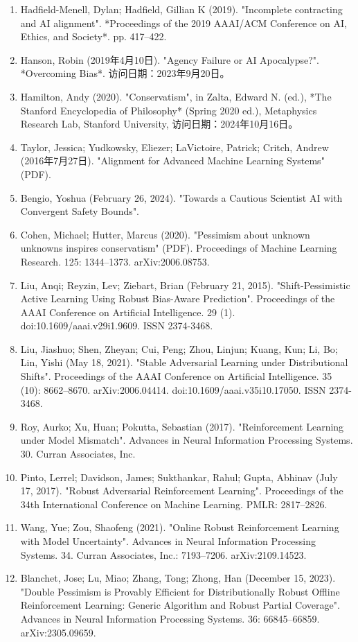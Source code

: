 \begin{enumerate}
\item Hadfield-Menell, Dylan; Hadfield, Gillian K (2019). "Incomplete contracting and AI alignment". *Proceedings of the 2019 AAAI/ACM Conference on AI, Ethics, and Society*. pp. 417–422.
\item Hanson, Robin (2019年4月10日). "Agency Failure or AI Apocalypse?". *Overcoming Bias*. 访问日期：2023年9月20日。
\item Hamilton, Andy (2020). "Conservatism", in Zalta, Edward N. (ed.), *The Stanford Encyclopedia of Philosophy* (Spring 2020 ed.), Metaphysics Research Lab, Stanford University, 访问日期：2024年10月16日。
\item Taylor, Jessica; Yudkowsky, Eliezer; LaVictoire, Patrick; Critch, Andrew (2016年7月27日). "Alignment for Advanced Machine Learning Systems" (PDF).
\item Bengio, Yoshua (February 26, 2024). "Towards a Cautious Scientist AI with Convergent Safety Bounds".
\item Cohen, Michael; Hutter, Marcus (2020). "Pessimism about unknown unknowns inspires conservatism" (PDF). Proceedings of Machine Learning Research. 125: 1344–1373. arXiv:2006.08753.
\item Liu, Anqi; Reyzin, Lev; Ziebart, Brian (February 21, 2015). "Shift-Pessimistic Active Learning Using Robust Bias-Aware Prediction". Proceedings of the AAAI Conference on Artificial Intelligence. 29 (1). doi:10.1609/aaai.v29i1.9609. ISSN 2374-3468.
\item Liu, Jiashuo; Shen, Zheyan; Cui, Peng; Zhou, Linjun; Kuang, Kun; Li, Bo; Lin, Yishi (May 18, 2021). "Stable Adversarial Learning under Distributional Shifts". Proceedings of the AAAI Conference on Artificial Intelligence. 35 (10): 8662–8670. arXiv:2006.04414. doi:10.1609/aaai.v35i10.17050. ISSN 2374-3468.
\item Roy, Aurko; Xu, Huan; Pokutta, Sebastian (2017). "Reinforcement Learning under Model Mismatch". Advances in Neural Information Processing Systems. 30. Curran Associates, Inc.
\item Pinto, Lerrel; Davidson, James; Sukthankar, Rahul; Gupta, Abhinav (July 17, 2017). "Robust Adversarial Reinforcement Learning". Proceedings of the 34th International Conference on Machine Learning. PMLR: 2817–2826.
\item Wang, Yue; Zou, Shaofeng (2021). "Online Robust Reinforcement Learning with Model Uncertainty". Advances in Neural Information Processing Systems. 34. Curran Associates, Inc.: 7193–7206. arXiv:2109.14523.
\item Blanchet, Jose; Lu, Miao; Zhang, Tong; Zhong, Han (December 15, 2023). "Double Pessimism is Provably Efficient for Distributionally Robust Offline Reinforcement Learning: Generic Algorithm and Robust Partial Coverage". Advances in Neural Information Processing Systems. 36: 66845–66859. arXiv:2305.09659.

\end{enumerate}
